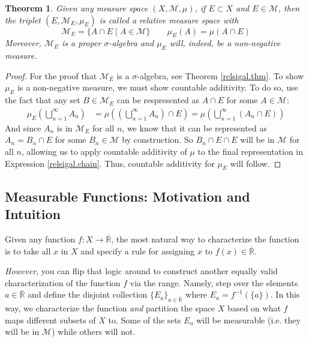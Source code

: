 \documentclass[12pt]{article}
\theoremstyle{plain}
\newtheorem{thm}{Theorem}[subsection]
\theoremstyle{definition}
\theoremstyle{remark}
\begin{document}
\begin{thm}
Given any measure space $(X,\mathscr{M},\mu)$, if $E\subset X$ and $E\in\mathscr{M}$, then the triplet $(E,\mathscr{M}_E,\mu_E)$ is called a \emph{relative measure space} with
\[
    \mathscr{M}_E = \{ A \cap E \; | \; A \in \mathscr{M}\}
    \qquad 
    \mu_E(A) = \mu(A\cap E)
\]
Moreover, $\mathscr{M}_E$ is a proper $\sigma$-algebra and $\mu_E$ will, indeed, be a non-negative measure.
\end{thm}
\begin{proof}
For the proof that $\mathscr{M}_E$ is a $\sigma$-algebra, see Theorem \ref{relsigal.thm}. To show $\mu_E$ is a non-negative measure, we must show countable additivity. To do so, use the fact that any set $B\in\mathscr{M}_E$ can be respresented as $A\cap E$ for some $A\in\mathscr{M}$:
\begin{align}
    \label{relsigal.chain}
    \mu_E\left(\bigcup^\infty_{n=1} A_n \right)
    &= \mu\left(\left(\bigcup^\infty_{n=1} A_n 
    \right) \cap E \right)
    = \mu\left(\bigcup^\infty_{n=1} (A_n 
    \cap E)\right) 
\end{align}
And since $A_n$ is in $\mathscr{M}_E$ for all $n$, we know that it can be represented as $A_n=B_n\cap E$ for some $B_n\in \mathscr{M}$ by construction. So $B_n \cap E \cap E$ will be in $\mathscr{M}$ for all $n$, allowing us to apply countable additivity of $\mu$ to the final representation in Expression \ref{relsigal.chain}. Thus, countable additivity for $\mu_E$ will follow.
\end{proof}


\subsection{Measurable Functions: Motivation and Intuition}

Given any function $f: X\rightarrow\bar{\mathbb{R}}$, the most natural way to characterize the function is to take all $x$ in $X$ and specify a rule for assigning $x$ to $f(x)\in\bar{\mathbb{R}}$. 

\emph{However}, you can flip that logic around to construct another equally valid characterization of the function $f$ via the range. Namely, step over the elements $a\in\bar{\mathbb{R}}$ and define the disjoint collection $\{E_a\}_{a\in\bar{\mathbb{R}}}$ where $E_a = f^{-1}\left(\{a\}\right)$. In this way, we characterize the function \emph{and} partition the space $X$ based on what $f$ maps different subsets of $X$ to.  Some of the sets $E_a$ will be measurable (i.e. they will be in $\mathscr{M}$) while others will not.
\end{document}
